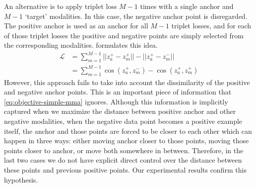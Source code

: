 \documentclass[sigconf,natbib=true,anonymous=true]{acmart}
\begin{document}
An alternative is to apply triplet loss $M-1$ times with a single anchor and $M-1$ `target' modalities.  In this case, the negative anchor point is disregarded. The positive anchor is used as an anchor for all $M-1$ triplet losses, and for each of those triplet losses the positive and negative points are simply selected from the corresponding modalities.  formulates this idea.
\begin{equation}
\label{eq:objective-simple-mma}
\begin{split}
    \mathcal{L}  &= \sum_{m=1}^{M-1} || z_{a}^{+} - z_{m}^{+} || - || z_{a}^{+} - z_{m}^{-} || \\
    &= \sum_{m=1}^{M-1} \cos(z_{a}^{+} ,z_{m}^{-}) - \cos(z_{a}^{+}, z_{m}^{+})
\end{split}
\end{equation}
However, this approach fails to take into account the dissimilarity of the positive and negative anchor points. This is an important piece of information that \cref{eq:objective-simple-mma} ignores. Although this information is implicitly captured when we maximize the distance between positive anchor and other negative modalities, when the negative data point becomes a positive example itself, the anchor and those points are forced to be closer to each other which can happen in three ways: either moving anchor closer to those points, moving those points closer to anchor, or move both somewhere in between. Therefore, in the last two cases we do not have explicit direct control over the distance between these points and previous positive points. Our experimental results confirm this hypothesis.
\end{document}
